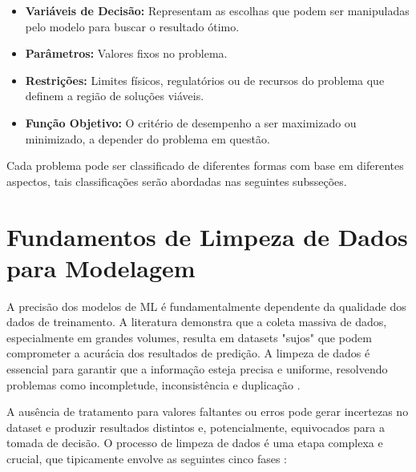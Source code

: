 \begin{itemize}
    \item \textbf{Variáveis de Decisão:} Representam as escolhas que podem ser manipuladas pelo modelo para buscar o resultado ótimo.
    \item \textbf{Parâmetros:}  Valores fixos no problema.
    \item \textbf{Restrições:} Limites físicos, regulatórios ou de recursos do problema que definem a região de soluções viáveis.
    \item \textbf{Função Objetivo:} O critério de desempenho a ser maximizado ou minimizado, a depender do problema em questão.
\end{itemize}

Cada problema pode ser classificado de diferentes formas com base em diferentes aspectos, tais classificações serão abordadas nas seguintes subsseções.

\section{Fundamentos de Limpeza de Dados para Modelagem}
\label{sec:limpeza_dados}

A precisão dos modelos de \gls{ML} é fundamentalmente dependente da qualidade dos dados de treinamento. A literatura demonstra que a coleta massiva de dados, especialmente em grandes volumes, resulta em datasets "sujos" que podem comprometer a acurácia dos resultados de predição. A limpeza de dados é essencial para garantir que a informação esteja precisa e uniforme, resolvendo problemas como incompletude, inconsistência e duplicação \cite{Ridzuan_2019_DataCleansing}.

A ausência de tratamento para valores faltantes ou erros pode gerar incertezas no dataset e produzir resultados distintos e, potencialmente, equivocados para a tomada de decisão. O processo de limpeza de dados é uma etapa complexa e crucial, que tipicamente envolve as seguintes cinco fases \cite{Ridzuan_2019_DataCleansing}:

